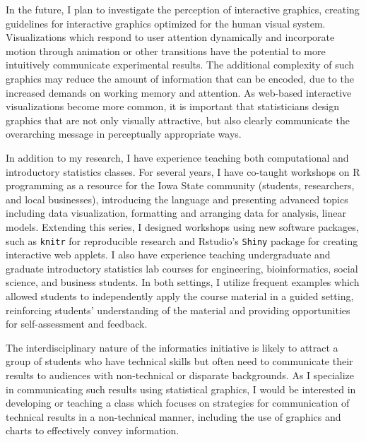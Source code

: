 \documentclass[11pt,letterpaper,sans,unicode]{moderncv}        %
\begin{document}
In the future, I plan to investigate the perception of interactive graphics, creating guidelines for interactive graphics optimized for the human visual system. Visualizations which respond to user attention dynamically and incorporate motion through animation or other transitions have the potential to more intuitively communicate experimental results. The additional complexity of such graphics may reduce the amount of information that can be encoded, due to the increased demands on working memory and attention. As web-based interactive visualizations become more common, it is important that statisticians design graphics that are not only visually attractive, but also clearly communicate the overarching message in perceptually appropriate ways.


In addition to my research, I have experience teaching both computational and introductory statistics classes. For several years, I have co-taught workshops on R programming as a resource for the Iowa State community (students, researchers, and local businesses), introducing the language and presenting advanced topics including data visualization, formatting and arranging data for analysis, linear models. Extending this series, I designed workshops using new software packages, such as \texttt{knitr} for reproducible research and Rstudio's \texttt{Shiny} package for creating interactive web applets. I also have experience teaching undergraduate and graduate introductory statistics lab courses for engineering, bioinformatics, social science, and business students. In both settings, I utilize frequent examples which allowed students to independently apply the course material in a guided setting, reinforcing students' understanding of the material and providing opportunities for self-assessment and feedback. 

The interdisciplinary nature of the informatics initiative is likely to attract a group of students who have technical skills but often need to communicate their results to audiences with non-technical or disparate backgrounds. As I specialize in communicating such results using statistical graphics, I would be interested in developing or teaching a class which focuses on strategies for communication of technical results in a non-technical manner, including the use of graphics and charts to effectively convey information. 
\end{document}
